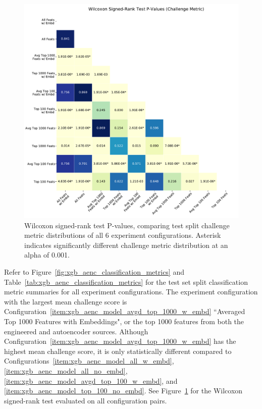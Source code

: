 \documentclass[\main/thesis.tex]{subfiles}
\begin{document}
\begin{figure}[t]
    \centering
    \includegraphics[width=12cm]{figure/xgb_aenc_wilcoxon_srt_p_vals.pdf}
    \caption[Wilcoxon signed-rank test P-values, comparing test split challenge metric distributions of all 6 experiment configurations.]{Wilcoxon signed-rank test P-values, comparing test split challenge metric distributions of all 6 experiment configurations. Asterisk indicates significantly different challenge metric distribution at an alpha of 0.001.}
    \label{fig:xgb_aenc_wilcoxon_srt_p_vals}
\end{figure}

Refer to Figure~\ref{fig:xgb_aenc_classification_metrics} and Table~\ref{tab:xgb_aenc_classification_metrics} for the test set split classification metric summaries for all experiment configurations.
The experiment configuration with the largest mean challenge score is Configuration~\ref{item:xgb_aenc_model_avgd_top_1000_w_embd} ``Averaged Top 1000 Features with Embeddings", or the top 1000 features from both the engineered and autoencoder sources.
Although Configuration~\ref{item:xgb_aenc_model_avgd_top_1000_w_embd} has the highest mean challenge score, it is only statistically different compared to Configurations~\ref{item:xgb_aenc_model_all_w_embd}, \ref{item:xgb_aenc_model_all_no_embd}, \ref{item:xgb_aenc_model_avgd_top_100_w_embd}, and \ref{item:xgb_aenc_model_top_100_no_embd}.
See Figure~\ref{fig:xgb_aenc_wilcoxon_srt_p_vals} for the Wilcoxon signed-rank test evaluated on all configuration pairs.
\end{document}
